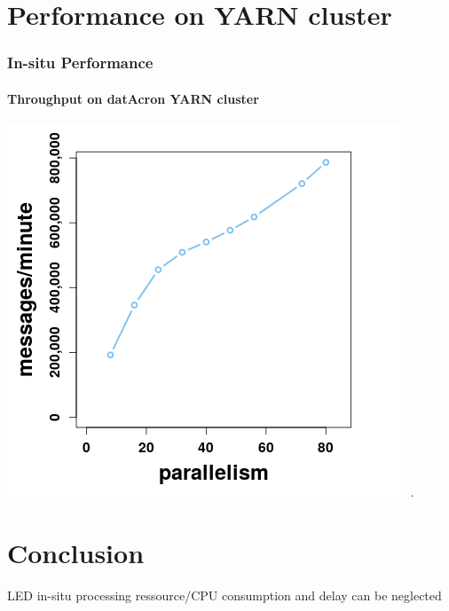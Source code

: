 \section{Performance on YARN cluster}
\frame
{	
	\frametitle{In-situ Performance}
	\framesubtitle{Throughput on datAcron YARN cluster}
		\begin{center}
		\includegraphics[width=.95\textwidth,height=.7\linewidth]{figures/throughput.png}
		.
	\end{center}
}


\section{Conclusion}
\frame
{	
	LED in-situ processing ressource/CPU consumption and delay
	can be neglected
}